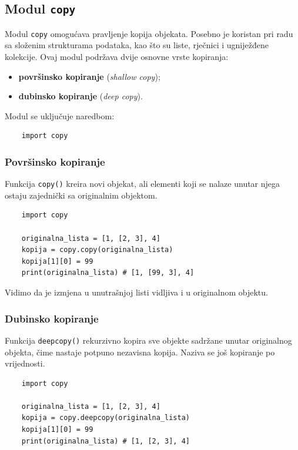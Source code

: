 \subsection{Modul \texttt{copy}}

Modul \texttt{copy} omogućava pravljenje kopija objekata. Posebno je koristan pri radu sa složenim strukturama podataka, kao što su liste, rječnici i ugniježđene kolekcije. Ovaj modul podržava dvije osnovne vrste kopiranja:

\begin{itemize}
	\item \textbf{površinsko kopiranje} (\emph{shallow copy});
	\item \textbf{dubinsko kopiranje} (\emph{deep copy}).
\end{itemize}

Modul se uključuje naredbom:

\begin{verbatim}
	import copy
\end{verbatim}

\subsubsection{Površinsko kopiranje}

Funkcija \texttt{copy()} kreira novi objekat, ali elementi koji se nalaze unutar njega ostaju zajednički sa originalnim objektom.

\begin{verbatim}
	import copy
	
	originalna_lista = [1, [2, 3], 4]
	kopija = copy.copy(originalna_lista)
	kopija[1][0] = 99
	print(originalna_lista) # [1, [99, 3], 4]
\end{verbatim}

Vidimo da je izmjena u unutrašnjoj listi vidljiva i u originalnom objektu.

\subsubsection{Dubinsko kopiranje}

Funkcija \texttt{deepcopy()} rekurzivno kopira sve objekte sadržane unutar originalnog objekta, čime nastaje potpuno nezavisna kopija. Naziva se još kopiranje po vrijednosti. 

\begin{verbatim}
	import copy
	
	originalna_lista = [1, [2, 3], 4]
	kopija = copy.deepcopy(originalna_lista)
	kopija[1][0] = 99
	print(originalna_lista) # [1, [2, 3], 4]
\end{verbatim}

